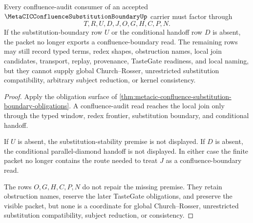 \begin{theorem}
\label{thm:metacic-confluence-substitution-boundary-nonescape}
Every confluence-audit consumer of an accepted $\MetaCICConfluenceSubstitutionBoundaryUp$ carrier must factor through
$$
T,R,U,D,J,O,G,H,C,P,N .
$$
If the substitution-boundary row $U$ or the conditional handoff row $D$ is absent, the packet no longer exports a confluence-boundary read. The remaining rows may still record typed terms, redex shapes, obstruction names, local join candidates, transport, replay, provenance, TasteGate readiness, and local naming, but they cannot supply global Church--Rosser, unrestricted substitution compatibility, arbitrary subject reduction, or kernel consistency.
\end{theorem}
\begin{proof}
Apply the obligation surface of \autoref{thm:metacic-confluence-substitution-boundary-obligations}. A confluence-audit read reaches the local join only through the typed window, redex frontier, substitution boundary, and conditional handoff.

If $U$ is absent, the substitution-stability premise is not displayed. If $D$ is absent, the conditional parallel-diamond handoff is not displayed. In either case the finite packet no longer contains the route needed to treat $J$ as a confluence-boundary read.

The rows $O,G,H,C,P,N$ do not repair the missing premise. They retain obstruction names, reserve the later TasteGate obligations, and preserve the visible packet, but none is a coordinate for global Church--Rosser, unrestricted substitution compatibility, subject reduction, or consistency.
\end{proof}

